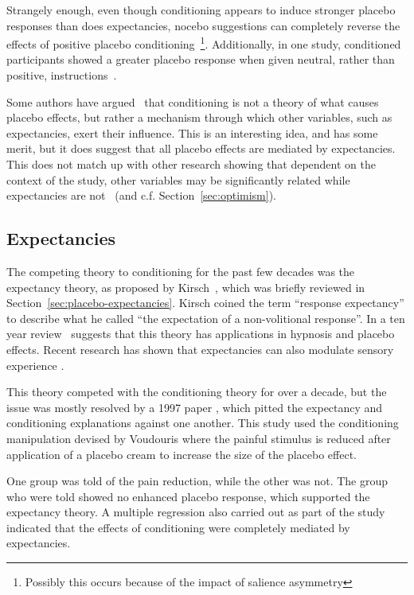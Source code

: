 Strangely enough, even though conditioning appears to induce stronger placebo responses than does expectancies, nocebo suggestions can completely reverse the effects of positive placebo conditioning~\cite{Benedetti2008}\footnote{Possibly this occurs because of the impact of salience asymmetry}. Additionally, in one study, conditioned participants showed a greater placebo response when given neutral, rather than positive, instructions~\cite{Klinger2007a}. 

Some authors have argued~\cite{Stewart-Williams2004b} that conditioning is not a theory of what causes placebo effects, but rather a mechanism through which other variables, such as expectancies, exert their influence. This is an interesting idea, and has some merit, but it does suggest that all placebo effects are mediated by expectancies.  This does not match up with other research showing that dependent on the context of the study, other variables may be significantly related while expectancies are not~\cite{Geers2005a,Hyland2006} (and c.f. Section~\ref{sec:optimism}).   

\subsection{Expectancies}
\label{sec:expectancies}

The competing theory to conditioning for the past few decades was the expectancy theory, as proposed by Kirsch~\cite{Kirsch1985}, which was briefly reviewed in Section~\ref{sec:placebo-expectancies}. Kirsch coined the term ``response expectancy'' to describe what he called ``the expectation of a non-volitional response''. In a ten year review~\cite{Kirsch1997} suggests that this theory has applications in hypnosis and placebo effects. Recent research has shown that expectancies can also modulate sensory experience  \cite{Sterzer2008}. 

This theory competed with the conditioning theory for over a decade, but the issue was mostly resolved by a 1997 paper \cite{Montgomery1997}, which pitted the expectancy and conditioning explanations against one another. This study used the conditioning manipulation devised by Voudouris \cite{Voudouris1985} where the painful stimulus is reduced after application of a placebo cream to increase the size of the placebo effect. 

One group was told of the pain reduction, while the other was not. The group who were told showed no enhanced placebo response, which supported the expectancy theory. A multiple regression also carried out as part of the study indicated that the effects of conditioning were completely mediated by expectancies. 

